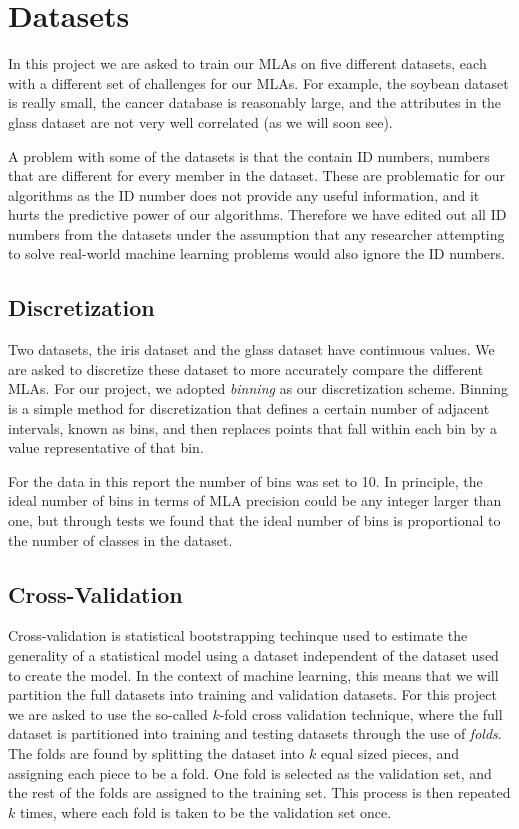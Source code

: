\documentclass{article}
\begin{document}
\section{Datasets}

	In this project we are asked to train our MLAs on five different datasets, each with a different set of challenges for our MLAs. 
	For example, the soybean dataset is really small, the cancer database is reasonably large, and the attributes in the glass dataset are not very well correlated (as we will soon see).
	
	A problem with some of the datasets is that the contain ID numbers, numbers that are different for every member in the dataset. These are problematic for our algorithms as the ID number does not provide any useful information, and it hurts the predictive power of our algorithms. Therefore we have edited out all ID numbers from the datasets under the assumption that any researcher attempting to solve real-world machine learning problems would also ignore the ID numbers.
	
	\subsection{Discretization}
	
		Two datasets, the iris dataset and the glass dataset have continuous values. 
		We are asked to discretize these dataset to more accurately compare the different MLAs.
		For our project, we adopted \textit{binning} as our discretization scheme.
		Binning is a simple method for discretization that defines a certain number of adjacent intervals, known as bins, and then replaces points that fall within each bin by a value representative of that bin.
		
		For the data in this report the number of bins was set to 10. In principle, the ideal number of bins in terms of MLA precision could be any integer larger than one, but through tests we found that the ideal number of bins is proportional to the number of classes in the dataset.
	
	\subsection{Cross-Validation}
	
		Cross-validation is statistical bootstrapping techinque used to estimate the generality of a statistical model using a dataset independent of the dataset used to create the model. 
		In the context of machine learning, this means that we will partition the full datasets into training and validation datasets. 
		For this project we are asked to use the so-called $k$-fold cross validation technique, where the full dataset is partitioned into training and testing datasets through the use of \textit{folds}. 
		The folds are found by splitting the dataset into $k$ equal sized pieces, and assigning each piece to be a fold. 
		One fold is selected as the validation set, and the rest of the folds are assigned to the training set. 
		This process is then repeated $k$ times, where each fold is taken to be the validation set once.
	
\end{document}
